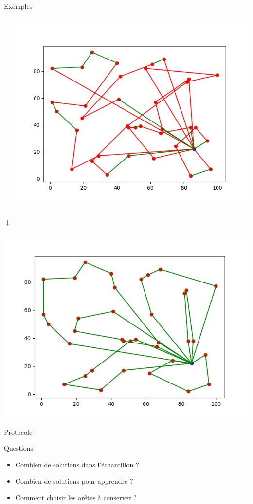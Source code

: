 \documentclass{beamer}
\begin{document}
\begin{frame}{Exemples}
\begin{columns}[t]
\begin{column}{4cm}
  \end{column}
  
  \begin{column}{4cm}
  	\centering
	\includegraphics[scale=0.25]{edges010101.png}

  \end{column}

 

 \end{columns}
 
 \centering
 $\downarrow$
 
 \includegraphics[scale=0.25]{edgesSol.png}
\end{frame}

\begin{frame}{Protocole}
\begin{alertblock}{Questions}
\begin{itemize}
\item Combien de solutions dans l'échantillon ?
\item Combien de solutions pour apprendre ?
\item Comment choisir les arêtes à conserver ?
\end{itemize}
\end{alertblock}
\end{frame}
\end{document}
